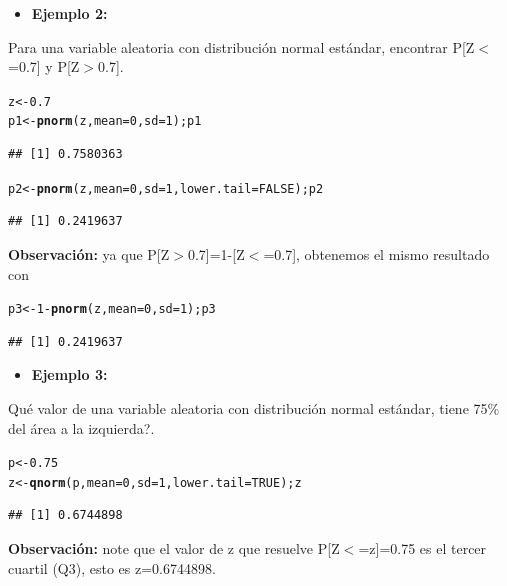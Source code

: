 \documentclass[12pt,letterpaper]{article}\usepackage[]{graphicx}\usepackage[]{color}
\makeatletter
\newcommand{\hlnum}[1]{\textcolor[rgb]{0.686,0.059,0.569}{#1}}%
\newcommand{\hlopt}[1]{\textcolor[rgb]{0,0,0}{#1}}%
\newcommand{\hlstd}[1]{\textcolor[rgb]{0.345,0.345,0.345}{#1}}%
\newcommand{\hlkwb}[1]{\textcolor[rgb]{0.69,0.353,0.396}{#1}}%
\newcommand{\hlkwc}[1]{\textcolor[rgb]{0.333,0.667,0.333}{#1}}%
\newcommand{\hlkwd}[1]{\textcolor[rgb]{0.737,0.353,0.396}{\textbf{#1}}}%
\newenvironment{kframe}{%
 \def\at@end@of@kframe{}%
 \ifinner\ifhmode%
  \def\at@end@of@kframe{\end{minipage}}%
  \begin{minipage}{\columnwidth}%
 \fi\fi%
 \def\FrameCommand##1{\hskip\@totalleftmargin \hskip-\fboxsep
 \colorbox{shadecolor}{##1}\hskip-\fboxsep
     \hskip-\linewidth \hskip-\@totalleftmargin \hskip\columnwidth}%
 \MakeFramed {\advance\hsize-\width
   \@totalleftmargin\z@ \linewidth\hsize
   \@setminipage}}%
 {\par\unskip\endMakeFramed%
 \at@end@of@kframe}
\newenvironment{knitrout}{}{} %
\makeatother
\begin{document}
\begin{itemize}
  \item \textbf{Ejemplo 2:}
\end{itemize}
Para una variable aleatoria con distribuci\'on normal est\'andar, encontrar 
P[Z$<$=0.7] y P[Z$>$0.7]. 
\begin{knitrout}
\color{fgcolor}\begin{kframe}
\begin{alltt}
\hlstd{z} \hlkwb{<-} \hlnum{0.7}
\hlstd{p1} \hlkwb{<-} \hlkwd{pnorm}\hlstd{(z,} \hlkwc{mean}\hlstd{=}\hlnum{0}\hlstd{,} \hlkwc{sd}\hlstd{=}\hlnum{1}\hlstd{); p1}
\end{alltt}
\begin{verbatim}
## [1] 0.7580363
\end{verbatim}
\begin{alltt}
\hlstd{p2} \hlkwb{<-} \hlkwd{pnorm}\hlstd{(z,} \hlkwc{mean}\hlstd{=}\hlnum{0}\hlstd{,} \hlkwc{sd}\hlstd{=}\hlnum{1}\hlstd{,} \hlkwc{lower.tail}\hlstd{=}\hlnum{FALSE}\hlstd{); p2}
\end{alltt}
\begin{verbatim}
## [1] 0.2419637
\end{verbatim}
\end{kframe}
\end{knitrout}
\textbf{Observaci\'on:} ya que P[Z$>$0.7]=1-[Z$<$=0.7], obtenemos el mismo resultado con
\begin{knitrout}
\color{fgcolor}\begin{kframe}
\begin{alltt}
\hlstd{p3} \hlkwb{<-} \hlnum{1}\hlopt{-}\hlkwd{pnorm}\hlstd{(z,} \hlkwc{mean}\hlstd{=}\hlnum{0}\hlstd{,} \hlkwc{sd}\hlstd{=}\hlnum{1}\hlstd{);p3}
\end{alltt}
\begin{verbatim}
## [1] 0.2419637
\end{verbatim}
\end{kframe}
\end{knitrout}

\begin{itemize}
  \item \textbf{Ejemplo 3:}
\end{itemize}
\¿Qu\'e valor de una variable aleatoria con distribuci\'on normal est\'andar, tiene 75\% 
del \'area a la izquierda?. 
\begin{knitrout}
\color{fgcolor}\begin{kframe}
\begin{alltt}
\hlstd{p} \hlkwb{<-} \hlnum{0.75}
\hlstd{z} \hlkwb{<-} \hlkwd{qnorm}\hlstd{(p,} \hlkwc{mean}\hlstd{=}\hlnum{0}\hlstd{,} \hlkwc{sd}\hlstd{=}\hlnum{1}\hlstd{,} \hlkwc{lower.tail} \hlstd{=} \hlnum{TRUE}\hlstd{); z}
\end{alltt}
\begin{verbatim}
## [1] 0.6744898
\end{verbatim}
\end{kframe}
\end{knitrout}
\textbf{Observaci\'on:} note que el valor de z que resuelve P[Z$<$=z]=0.75 es el tercer cuartil (Q3), esto es z=0.6744898.
\end{document}
